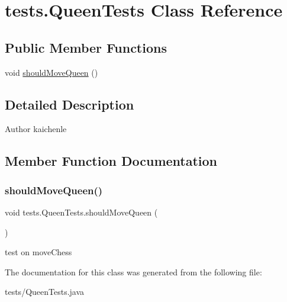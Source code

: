 \hypertarget{classtests_1_1_queen_tests}{}\section{tests.\+Queen\+Tests Class Reference}
\label{classtests_1_1_queen_tests}
\subsection*{Public Member Functions}
\begin{DoxyCompactItemize}
\item 
void \mbox{\hyperlink{classtests_1_1_queen_tests_a0b36ca704b99d0b5ff60e2a4556b0332}{should\+Move\+Queen}} ()
\end{DoxyCompactItemize}


\subsection{Detailed Description}
\begin{DoxyAuthor}{Author}
kaichenle 
\end{DoxyAuthor}


\subsection{Member Function Documentation}
\mbox{\label{classtests_1_1_queen_tests_a0b36ca704b99d0b5ff60e2a4556b0332}} 
\subsubsection{\texorpdfstring{should\+Move\+Queen()}{shouldMoveQueen()}}
{\footnotesize\ttfamily void tests.\+Queen\+Tests.\+should\+Move\+Queen (\begin{DoxyParamCaption}{ }\end{DoxyParamCaption})\hspace{0.3cm}{\ttfamily [inline]}}

test on move\+Chess 

The documentation for this class was generated from the following file\+:\begin{DoxyCompactItemize}
\item 
tests/Queen\+Tests.\+java\end{DoxyCompactItemize}
